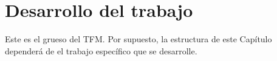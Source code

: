 \chapter{Desarrollo del trabajo}
Este es el grueso del TFM. Por supuesto, la estructura de este Capítulo dependerá de el trabajo específico que se desarrolle.

